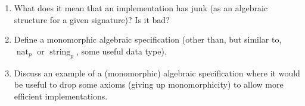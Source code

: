 \documentclass{article}
\newcommand{\tmdummy}{$\mbox{}$}
\newcommand{\tmop}[1]{\ensuremath{\operatorname{#1}}}
\begin{document}
\begin{exercise}
  {\tmdummy}
  
  \begin{enumerate}
    \item What does it mean that an implementation has junk (as an algebraic
    structure for a given signature)? Is it bad?
    
    \item Define a monomorphic algebraic specification (other than, but
    similar to, $\tmop{nat}_p$ or $\tmop{string}_p$, some useful data type).
    
    \item Discuss an example of a (monomorphic) algebraic specification where
    it would be useful to drop some axioms (giving up monomorphicity) to allow
    more efficient implementations.
  \end{enumerate}
\end{exercise}
\end{document}
